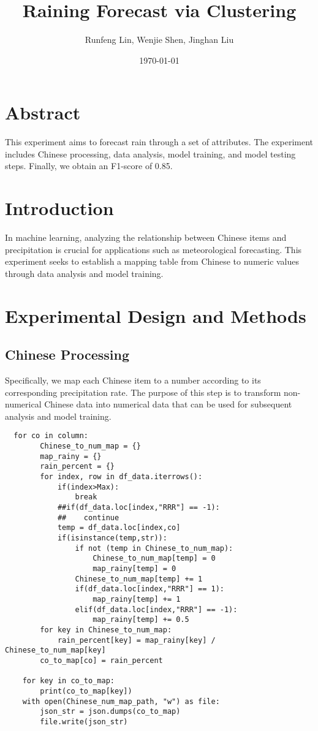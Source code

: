 \documentclass[twocolumn]{article}
\title{Raining Forecast via Clustering}
\author{Runfeng Lin, Wenjie Shen, Jinghan Liu}
\date{\today}
\begin{document}
\maketitle

\section{Abstract}
This experiment aims to forecast rain through a set of attributes. The experiment includes Chinese processing, data analysis, model training, and model testing steps. Finally, we obtain an F1-score of 0.85.

\section{Introduction}

In machine learning, analyzing the relationship between Chinese items and precipitation is crucial for applications such as meteorological forecasting. This experiment seeks to establish a mapping table from Chinese to numeric values through data analysis and model training.

\section{Experimental Design and Methods}

\subsection{Chinese Processing}

Specifically, we map each Chinese item to a number according to its corresponding precipitation rate. The purpose of this step is to transform non-numerical Chinese data into numerical data that can be used for subsequent analysis and model training.

\begin{lstlisting}
  for co in column:
        Chinese_to_num_map = {}        
        map_rainy = {}            
        rain_percent = {}
        for index, row in df_data.iterrows():
            if(index>Max):
                break
            ##if(df_data.loc[index,"RRR"] == -1):         
            ##    continue
            temp = df_data.loc[index,co]
            if(isinstance(temp,str)):     
                if not (temp in Chinese_to_num_map):
                    Chinese_to_num_map[temp] = 0
                    map_rainy[temp] = 0
                Chinese_to_num_map[temp] += 1       
                if(df_data.loc[index,"RRR"] == 1):
                    map_rainy[temp] += 1
                elif(df_data.loc[index,"RRR"] == -1):      
                    map_rainy[temp] += 0.5
        for key in Chinese_to_num_map:              
            rain_percent[key] = map_rainy[key] / Chinese_to_num_map[key]
        co_to_map[co] = rain_percent

    for key in co_to_map:
        print(co_to_map[key])
    with open(Chinese_num_map_path, "w") as file:
        json_str = json.dumps(co_to_map)
        file.write(json_str)
\end{lstlisting}
\end{document}
